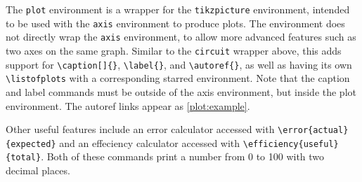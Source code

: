 \documentclass[../example.tex]{subfiles}
\begin{document}
The \verb|plot| environment is a wrapper for the \verb|tikzpicture| environment, intended to be used with the \verb|axis| environment to produce plots. The environment does not directly wrap the \verb|axis| environment, to allow more advanced features such as two axes on the same graph. Similar to the \verb|circuit| wrapper above, this adds support for \verb|\caption[]{}|, \verb|\label{}|, and \verb|\autoref{}|, as well as having its own \verb|\listofplots| with a corresponding starred environment. Note that the caption and label commands must be outside of the axis environment, but inside the plot environment. The autoref links appear as \autoref{plot:example}.

Other useful features include an error calculator accessed with \verb|\error{actual}{expected}| and an effeciency calculator accessed with \verb|\efficiency{useful}{total}|. Both of these commands print a number from 0 to 100 with two decimal places.
\end{document}
